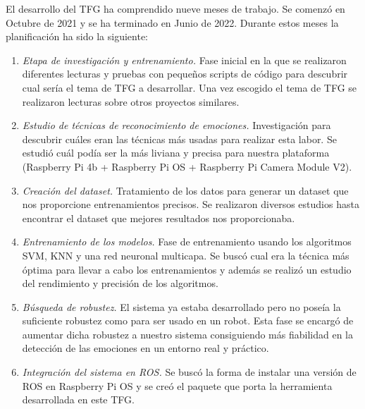 El desarrollo del TFG ha comprendido nueve meses de trabajo. Se comenzó en Octubre de 2021 y se ha terminado en Junio de 2022. Durante estos meses la planificación ha sido la siguiente:

\begin{enumerate}
    \item \textit{Etapa de investigación y entrenamiento.} Fase inicial en la que se realizaron diferentes lecturas y pruebas con pequeños scripts de código para descubrir cual sería el tema de TFG a desarrollar. Una vez escogido el tema de TFG se realizaron lecturas sobre otros proyectos similares.
    
    \item \textit{Estudio de técnicas de reconocimiento de emociones.} Investigación para descubrir cuáles eran las técnicas más usadas para realizar esta labor. Se estudió cuál podía ser la más liviana y precisa para nuestra plataforma (Raspberry Pi 4b + Raspberry Pi OS + Raspberry Pi Camera Module V2).
    
    \item \textit{Creación del dataset.} Tratamiento de los datos para generar un dataset que nos proporcione entrenamientos precisos. Se realizaron diversos estudios hasta encontrar el dataset que mejores resultados nos proporcionaba.
    
    \item \textit{Entrenamiento de los modelos.} Fase de entrenamiento usando los algoritmos SVM, KNN y una red neuronal multicapa. Se buscó cual era la técnica más óptima para llevar a cabo los entrenamientos y además se realizó un estudio del rendimiento y precisión de los algoritmos.
    
    \item \textit{Búsqueda de robustez.} El sistema ya estaba desarrollado pero no poseía la suficiente robustez como para ser usado en un robot. Esta fase se encargó de aumentar dicha robustez a nuestro sistema consiguiendo más fiabilidad en la detección de las emociones en un entorno real y práctico.
    
    \item \textit{Integración del sistema en ROS.} Se buscó la forma de instalar una versión de ROS en Raspberry Pi OS y se creó el paquete que porta la herramienta desarrollada en este TFG.
\end{enumerate}
